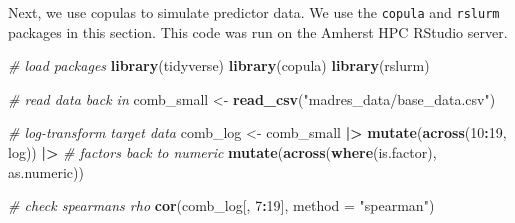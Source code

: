 \documentclass[12pt, twoside]{amherstthesis}
\newenvironment{Shaded}{\begin{snugshade}}{\end{snugshade}}
\newcommand{\AttributeTok}[1]{\textcolor[rgb]{0.13,0.29,0.53}{#1}}
\newcommand{\CommentTok}[1]{\textcolor[rgb]{0.56,0.35,0.01}{\textit{#1}}}
\newcommand{\DecValTok}[1]{\textcolor[rgb]{0.00,0.00,0.81}{#1}}
\newcommand{\FunctionTok}[1]{\textcolor[rgb]{0.13,0.29,0.53}{\textbf{#1}}}
\newcommand{\NormalTok}[1]{#1}
\newcommand{\OtherTok}[1]{\textcolor[rgb]{0.56,0.35,0.01}{#1}}
\newcommand{\SpecialCharTok}[1]{\textcolor[rgb]{0.81,0.36,0.00}{\textbf{#1}}}
\newcommand{\StringTok}[1]{\textcolor[rgb]{0.31,0.60,0.02}{#1}}
\begin{document}
Next, we use copulas to simulate predictor data. We use the \texttt{copula} and \texttt{rslurm} packages in this section. This code was run on the Amherst HPC RStudio server.
\begin{Shaded}
\begin{Highlighting}[]
\CommentTok{\# load packages}
\FunctionTok{library}\NormalTok{(tidyverse)}
\FunctionTok{library}\NormalTok{(copula)}
\FunctionTok{library}\NormalTok{(rslurm)}
\end{Highlighting}
\end{Shaded}
\begin{Shaded}
\begin{Highlighting}[]
\CommentTok{\# read data back in}
\NormalTok{comb\_small }\OtherTok{\textless{}{-}} \FunctionTok{read\_csv}\NormalTok{(}\StringTok{"madres\_data/base\_data.csv"}\NormalTok{)}

\CommentTok{\# log{-}transform target data}
\NormalTok{comb\_log }\OtherTok{\textless{}{-}}\NormalTok{ comb\_small }\SpecialCharTok{|\textgreater{}} 
  \FunctionTok{mutate}\NormalTok{(}\FunctionTok{across}\NormalTok{(}\DecValTok{10}\SpecialCharTok{:}\DecValTok{19}\NormalTok{, log)) }\SpecialCharTok{|\textgreater{}} 
  \CommentTok{\# factors back to numeric}
  \FunctionTok{mutate}\NormalTok{(}\FunctionTok{across}\NormalTok{(}\FunctionTok{where}\NormalTok{(is.factor), as.numeric))}

\CommentTok{\# check spearman\textquotesingle{}s rho}
\FunctionTok{cor}\NormalTok{(comb\_log[, }\DecValTok{7}\SpecialCharTok{:}\DecValTok{19}\NormalTok{], }\AttributeTok{method =} \StringTok{"spearman"}\NormalTok{)}
\end{Highlighting}
\end{Shaded}
\end{document}
